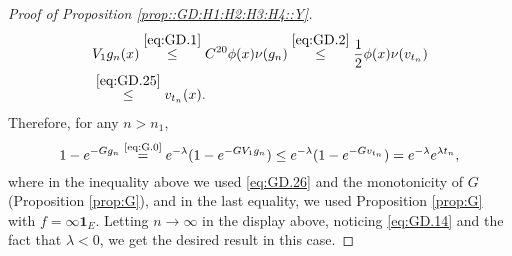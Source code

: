\documentclass[12pt,a4paper]{amsart}
\numberwithin{equation}{section}
\theoremstyle{plain}
\theoremstyle{definition}
\theoremstyle{remark}
\begin{document}
\begin{proof}[Proof of Proposition \ref{prop::GD:H1:H2:H3:H4::Y}]
\begin{align}
	& V_1g_n(x)
\overset{\eqref{eq:GD.1}}\leq C^{20} \phi(x)\nu(g_n)
	\overset{\eqref{eq:GD.2}}\leq \frac{1}{2}\phi(x)\nu(v_{t_n})
	\\\label{eq:GD.26} & \overset{\eqref{eq:GD.25}}\leq v_{t_n}(x).
\end{align}
	Therefore, for any $n>n_1$,
\begin{equation}
	1 - e^{- Gg_n}
	\overset{\text{\eqref{eq:G.0}}}= e^{- \lambda} (1- e^{- GV_1g_n})
	\leq e^{- \lambda} (1- e^{- G v_{t_n}})
	= e^{- \lambda} e^{\lambda t_n},
\end{equation}
	where in the inequality above we used \eqref{eq:GD.26} and the monotonicity of $G$ (Proposition \ref{prop:G}), and in the last equality, we used Proposition \ref{prop:G} with $f = \infty \mathbf 1_E$.
	Letting $n\to \infty$ in the display above, noticing \eqref{eq:GD.14} and the fact that $\lambda < 0$,
	we get the desired result in this case.


\end{proof}
\end{document}
